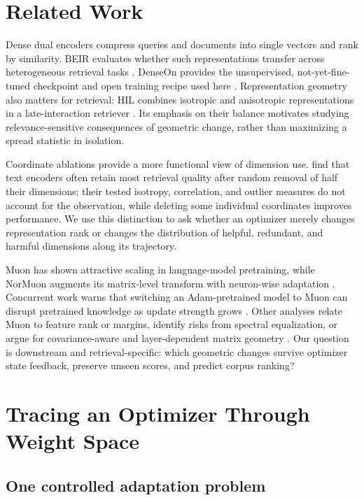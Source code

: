 \documentclass[11pt]{article}
\begin{document}
\section{Related Work}

Dense dual encoders compress queries and documents into single vectors and rank by similarity.
BEIR evaluates whether such representations transfer across heterogeneous retrieval tasks
\citep{thakur2021beir}. DenseOn provides the unsupervised, not-yet-fine-tuned checkpoint and open
training recipe used here \citep{sourty2026denseon}. Representation geometry also matters for
retrieval: HIL combines isotropic and anisotropic representations in a late-interaction retriever
\citep{kim2024hil}. Its emphasis on their balance motivates studying relevance-sensitive
consequences of geometric change, rather than maximizing a spread statistic in isolation.

Coordinate ablations provide a more functional view of dimension use. \citet{takeshita2025dimensions}
find that text encoders often retain most retrieval quality after random removal of half their
dimensions; their tested isotropy, correlation, and outlier measures do not account for the
observation, while deleting some individual coordinates improves performance. We use this distinction to ask whether an optimizer
merely changes representation rank or changes the distribution of helpful, redundant, and harmful
dimensions along its trajectory.

Muon has shown attractive scaling in language-model pretraining, while NorMuon augments its
matrix-level transform with neuron-wise adaptation \citep{liu2025muon,li2025normuon}. Concurrent
work warns that switching an Adam-pretrained model to Muon can disrupt pretrained knowledge as
update strength grows \citep{qu2026finetune,liu2026consistency}. Other analyses relate Muon to
feature rank or margins, identify risks from spectral equalization, or argue for covariance-aware
and layer-dependent matrix geometry \citep{ruan2026features,pang2026htmuon,du2026newtonmuon,
massena2026schatten}. Our question is downstream and retrieval-specific: which geometric changes
survive optimizer state feedback, preserve unseen scores, and predict corpus ranking?

\section{Tracing an Optimizer Through Weight Space}

\subsection{One controlled adaptation problem}
\end{document}
